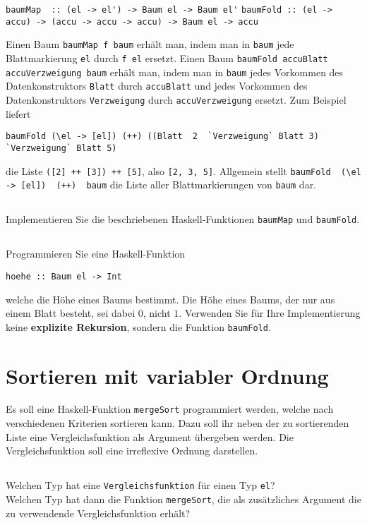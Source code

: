 \documentclass[
  10pt,                   %
  DIV12,
  german,                 %
  oneside,                %
  parskip=half,           %
  headings=normal,        %
  captions=tableheading,  %
]{scrartcl}
\begin{document}
\begin{center}
\lstinline|baumMap  :: (el -> el') -> Baum el -> Baum el'|
\lstinline|baumFold :: (el -> accu) -> (accu -> accu -> accu) -> Baum el -> accu|
\end{center}

Einen Baum \lstinline|baumMap f baum| erhält man, indem man in  \lstinline|baum| jede Blattmarkierung \lstinline|el|
durch \lstinline|f el| ersetzt. Einen Baum \lstinline|baumFold accuBlatt accuVerzweigung baum| erhält man,
indem man in \lstinline|baum| jedes Vorkommen des Datenkonstruktors \lstinline|Blatt| durch \lstinline|accuBlatt| und
jedes Vorkommen des Datenkonstruktors \lstinline|Verzweigung| durch \lstinline|accuVerzweigung| ersetzt.
Zum Beispiel liefert
\begin{center}
\lstinline|baumFold (\el -> [el]) (++) ((Blatt  2  `Verzweigung` Blatt 3) `Verzweigung` Blatt 5)|
\end{center}
die Liste \lstinline|([2] ++ [3]) ++ [5]|, also \lstinline|[2, 3, 5]|. Allgemein stellt \lstinline|baumFold  (\el -> [el])  (++)  baum|
die Liste aller Blattmarkierungen von \lstinline|baum| dar.
\subsection{}
Implementieren Sie die beschriebenen Haskell-Funktionen \lstinline|baumMap| und \lstinline|baumFold|.
\subsection{}
Programmieren Sie eine Haskell-Funktion 
\begin{center}
\lstinline|hoehe :: Baum el -> Int|
\end{center}
welche die Höhe
eines Baums bestimmt. Die Höhe eines Baums, der nur aus einem Blatt besteht, sei
dabei $0$, nicht $1$. Verwenden Sie für Ihre Implementierung keine \textbf{explizite Rekursion},
sondern die Funktion \lstinline|baumFold|.

\section{Sortieren mit variabler Ordnung}
Es soll eine Haskell-Funktion \lstinline|mergeSort| programmiert werden, welche nach verschiedenen
Kriterien sortieren kann. Dazu soll ihr neben der zu sortierenden Liste eine
Vergleichsfunktion als Argument übergeben werden. Die Vergleichsfunktion soll eine
irreflexive Ordnung darstellen.
\subsection{}
Welchen Typ hat eine \lstinline|Vergleichsfunktion| für einen Typ \lstinline|el|?\\
Welchen Typ hat dann die Funktion \lstinline|mergeSort|, die als zusätzliches Argument die
zu verwendende Vergleichsfunktion erhält?
\end{document}
